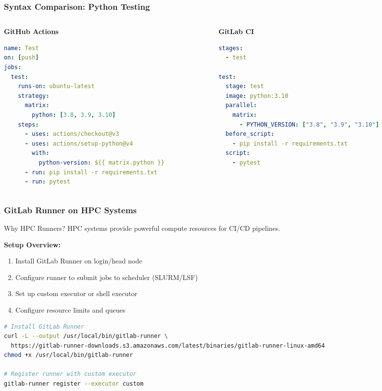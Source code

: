 \begin{frame}[fragile]
	\frametitle{Syntax Comparison: Python Testing}
	\begin{columns}
		\begin{column}{0.5\textwidth}
			\textbf{GitHub Actions}
			\begin{lstlisting}[language=yaml, style=Shell]
name: Test
on: [push]
jobs:
  test:
    runs-on: ubuntu-latest
    strategy:
      matrix:
        python: [3.8, 3.9, 3.10]
    steps:
      - uses: actions/checkout@v3
      - uses: actions/setup-python@v4
        with:
          python-version: ${{ matrix.python }}
      - run: pip install -r requirements.txt
      - run: pytest
			\end{lstlisting}
		\end{column}
		\begin{column}{0.5\textwidth}
			\textbf{GitLab CI}
			\begin{lstlisting}[language=yaml, style=Shell]
stages:
  - test

test:
  stage: test
  image: python:3.10
  parallel:
    matrix:
      - PYTHON_VERSION: ["3.8", "3.9", "3.10"]
  before_script:
    - pip install -r requirements.txt
  script:
    - pytest
			\end{lstlisting}
		\end{column}
	\end{columns}
\end{frame}

\begin{frame}[fragile]
	\frametitle{GitLab Runner on HPC Systems}
	\begin{block}{Why HPC Runners?}
		{HPC systems provide powerful compute resources for CI/CD pipelines.}
	\end{block}
	\pause
	\textbf{Setup Overview:}
	\begin{enumerate}
		\item Install GitLab Runner on login/head node
		\item Configure runner to submit jobs to scheduler (SLURM/LSF)
		\item Set up custom executor or shell executor
		\item Configure resource limits and queues
	\end{enumerate}
	\pause
	\begin{lstlisting}[language=bash, style=Shell]
# Install GitLab Runner
curl -L --output /usr/local/bin/gitlab-runner \
  https://gitlab-runner-downloads.s3.amazonaws.com/latest/binaries/gitlab-runner-linux-amd64
chmod +x /usr/local/bin/gitlab-runner

# Register runner with custom executor
gitlab-runner register --executor custom
	\end{lstlisting}
\end{frame}

